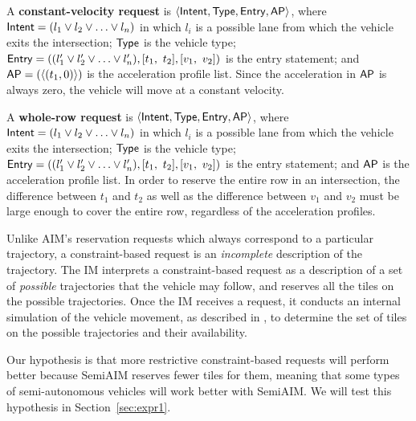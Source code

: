 \begin{small_ind_s_itemize}
\item A \textbf{constant-velocity request}
is $\langle {\sf Intent}, {\sf Type}, {\sf Entry}, {\sf AP} \rangle$,
where
${\sf Intent} = ( l_1 \vee l_2 \vee \ldots \vee l_n )$
in which $l_i$ is a possible lane from which the vehicle 
exits the intersection;
${\sf Type}$ is the vehicle type;
${\sf Entry} = (( l'_1 \vee l'_2 \vee \ldots \vee l'_n ), [t_1,\ t_2], [v_1,\ v_2])$
is the entry statement; and
${\sf AP} = ( \langle (t_1, 0) \rangle )$
is the acceleration profile list.
Since the acceleration in ${\sf AP}$
is always zero, the vehicle will move at a constant velocity.

\item A \textbf{whole-row request}
is $\langle {\sf Intent}, {\sf Type}, {\sf Entry}, {\sf AP} \rangle$,
where
${\sf Intent} = ( l_1 \vee l_2 \vee \ldots \vee l_n )$
in which $l_i$ is a possible lane from which the vehicle 
exits the intersection;
${\sf Type}$ is the vehicle type;
${\sf Entry} = (( l'_1 \vee l'_2 \vee \ldots \vee l'_n ), [t_1,\ t_2], [v_1,\ v_2])$
is the entry statement; and
${\sf AP}$ is the acceleration profile list.
In order to reserve the entire row in an intersection,
the difference between $t_1$ and $t_2$ 
as well as the difference between $v_1$ and $v_2$
must be large enough to cover the entire row,
regardless of the acceleration profiles.
\end{small_ind_s_itemize}

\noindent
Unlike AIM's reservation requests which always correspond to a
particular trajectory, a constraint-based request is an
\emph{incomplete} description of the trajectory.  The IM
interprets a constraint-based request as a description of a set of
\emph{possible} trajectories that the vehicle may follow, and reserves
all the tiles on the possible trajectories.  Once the IM receives a
request, it conducts an internal simulation of the vehicle
movement, as described in \cite{bib:Dresner08Multiagent}, to determine
the set of tiles on the possible trajectories and their availability.

Our hypothesis is that more restrictive constraint-based requests
will perform better because SemiAIM reserves fewer tiles for them,
meaning that some types of semi-autonomous vehicles will work better
with SemiAIM.  We will test this hypothesis in
Section~\ref{sec:expr1}.


